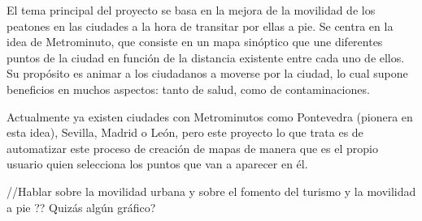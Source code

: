 
El tema principal del proyecto se basa en la mejora de la movilidad de los peatones en las ciudades a la hora de transitar por ellas a pie. Se centra en la idea de Metrominuto, que consiste en un mapa sinóptico que une diferentes puntos de la ciudad en función de la distancia existente entre cada uno de ellos. Su propósito es animar a los ciudadanos a moverse por la ciudad, lo cual supone beneficios en muchos aspectos: tanto de salud, como de contaminaciones.

Actualmente ya existen ciudades con Metrominutos como Pontevedra (pionera en esta idea), Sevilla, Madrid o León, pero este proyecto lo que trata es de automatizar este proceso de creación de mapas de manera que es el propio usuario quien selecciona los puntos que van a aparecer en él.

//Hablar sobre la movilidad urbana y sobre el fomento del turismo y la movilidad a pie ?? Quizás algún gráfico?


